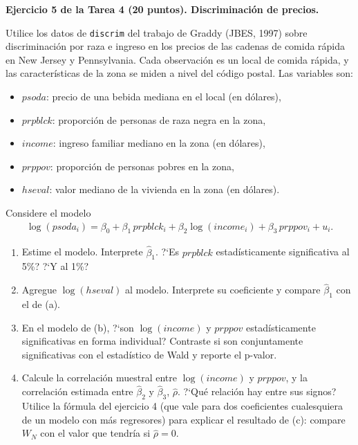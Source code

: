 \documentclass[letterpaper,11pt]{article}
\begin{document}
\vspace{1em}

\noindent\textbf{Ejercicio 5 de la Tarea 4 (20 puntos). Discriminación de precios.}

Utilice los datos de \texttt{discrim} del trabajo de Graddy (JBES, 1997)
sobre discriminaci\'on por raza e ingreso en los precios de las cadenas de comida r\'apida en
New Jersey y Pennsylvania. Cada observaci\'on es un local de comida r\'apida, y las
caracter\'isticas de la zona se miden a nivel del c\'odigo postal. Las variables son:
\begin{itemize}
    \item $psoda$: precio de una bebida mediana en el local (en d\'olares),
    \item $prpblck$: proporci\'on de personas de raza negra en la zona,
    \item $income$: ingreso familiar mediano en la zona (en d\'olares),
    \item $prppov$: proporci\'on de personas pobres en la zona,
    \item $hseval$: valor mediano de la vivienda en la zona (en d\'olares).
\end{itemize}
Considere el modelo
\begin{align*}
\log(psoda_i)=\beta_0+\beta_1\, prpblck_i+\beta_2 \log(income_i) +\beta_3\, prppov_i +u_i.
\end{align*}
\begin{enumerate}
    \item Estime el modelo. Interprete $\hat\beta_1$. ?`Es $prpblck$
        estad\'isticamente significativa al 5\%? ?`Y al 1\%?
    \item Agregue $\log(hseval)$ al modelo. Interprete su coeficiente y
        compare $\hat\beta_1$ con el de (a).
    \item En el modelo de (b), ?`son $\log(income)$ y $prppov$
        estad\'isticamente significativas en forma individual? Contraste si son
        conjuntamente significativas con el estad\'istico de Wald y reporte el p-valor.
    \item Calcule la correlaci\'on muestral entre $\log(income)$ y $prppov$, y
        la correlaci\'on estimada entre $\hat\beta_2$ y $\hat\beta_3$, $\hat\rho$. ?`Qu\'e
        relaci\'on hay entre sus signos? Utilice la f\'ormula del ejercicio 4 (que vale para
        dos coeficientes cualesquiera de un modelo con m\'as regresores) para explicar el
        resultado de (c): compare $W_N$ con el valor que tendr\'ia si $\hat\rho=0$.
\end{enumerate}
\end{document}
